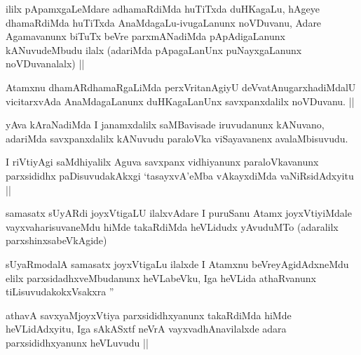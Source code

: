 
\begin{artha}
ililx pApamxgaLeMdare adhamaRdiMda huTiTxda duHKagaLu, hAgeye dhamaRdiMda huTiTxda AnaMdagaLu-ivugaLanunx noVDuvanu, Adare Agamavanunx biTuTx beVre parxmANadiMda pApAdigaLanunx kANuvudeMbudu ilalx (adariMda pApagaLanUnx puNayxgaLanunx noVDuvanalalx) ||
\end{artha}


\begin{artha}
Atamxnu dhamARdhamaRgaLiMda perxVritanAgiyU deVvatAnugarxhadiMdalU vicitarxvAda AnaMdagaLanunx duHKagaLanUnx savxpanxdalilx noVDuvanu. ||
\end{artha}


\begin{artha}
yAva kAraNadiMda I janamxdalilx saMBavisade iruvudanunx kANuvano, adariMda savxpanxdalilx kANuvudu paraloVka viSayavanenx avalaMbisuvudu.
\end{artha}


\begin{artha}
I riVtiyAgi saMdhiyalilx Aguva savxpanx vidhiyanunx paraloVkavanunx parxsididhx paDisuvudakAkxgi `tasayxvA'eMba vAkayxdiMda vaNiRsidAdxyitu ||
\end{artha}

\begin{artha}
samasatx sUyARdi joyxVtigaLU ilalxvAdare I puruSanu Atamx joyxVtiyiMdale vayxvaharisuvaneMdu hiMde takaRdiMda heVLidudx yAvuduMTo (adaralilx parxshinxsabeVkAgide) 
\end{artha}

\begin{artha}
sUyaRmodalA samasatx joyxVtigaLu ilalxde I Atamxnu beVreyAgidAdxneMdu elilx parxsidadhxveMbudanunx heVLabeVku, Iga heVLida athaRvanunx tiLisuvudakokxVsakxra \stext''
\end{artha}


\begin{artha}
athavA savxyaMjoyxVtiya parxsididhxyanunx takaRdiMda hiMde heVLidAdxyitu, Iga sAkASxtf neVrA vayxvadhAnavilalxde adara parxsididhxyanunx heVLuvudu ||
\end{artha}

